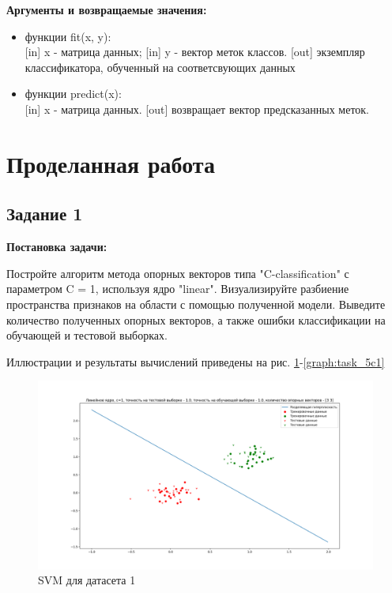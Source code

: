 \documentclass[a4paper,14pt]{article}
\begin{document}
\textbf{Аргументы и возвращаемые значения:}
\begin{itemize}
	\item функции fit(x, y):\\ {[in]} x - матрица данных; {[in]} y - вектор меток классов. {[out]} экземпляр классификатора, обученный на соответсвующих данных
	\item функции predict(x): \\ {[in]} x - матрица данных. {[out]} возвращает вектор предсказанных меток.
\end{itemize}

\section{Проделанная работа}

\subsection{Задание 1}

\textbf{Постановка задачи:}

Постройте алгоритм метода опорных векторов типа "C-classification" с параметром C = 1, используя ядро "linear". Визуализируйте разбиение пространства признаков на области с помощью полученной модели. Выведите количество полученных опорных векторов, а также ошибки классификации на обучающей и тестовой выборках.

Иллюстрации и результаты вычислений приведены на рис. \ref{graph:task_1c1}-\ref{graph:task_5c1}

\begin{figure}[H]
\includegraphics[width=\textwidth, keepaspectratio]{task_1c1.png}
\caption{SVM для датасета 1}
\label{graph:task_1c1}
\end{figure}
\end{document}
